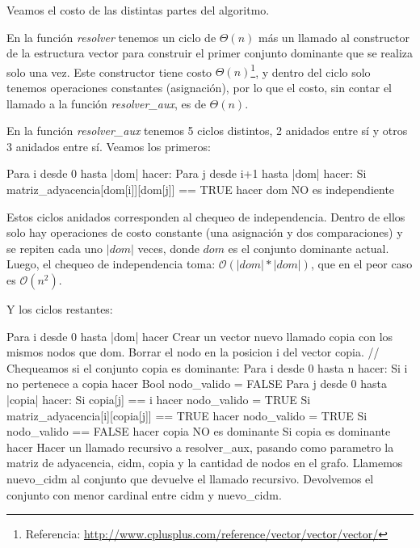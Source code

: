 Veamos el costo de las distintas partes del algoritmo.

En la función \textit{resolver} tenemos un ciclo de $\Theta(n)$ más un llamado al constructor de la estructura vector para construir el primer conjunto dominante que se realiza solo una vez. Este constructor tiene costo $\Theta(n)$\footnote{Referencia: \url{http://www.cplusplus.com/reference/vector/vector/vector/}}, y dentro del ciclo solo tenemos operaciones constantes (asignación), por lo que el costo, sin contar el llamado a la función \textit{resolver_aux}, es de $\Theta(n)$.

En la función \textit{resolver_aux} tenemos 5 ciclos distintos, 2 anidados entre sí y otros 3 anidados entre sí. Veamos los primeros:

\begin{codesnippet}
Para i desde 0 hasta |dom| hacer:
    Para j desde i+1 hasta |dom| hacer:
        Si matriz_adyacencia[dom[i]][dom[j]] == TRUE hacer
            dom NO es independiente
\end{codesnippet}

Estos ciclos anidados corresponden al chequeo de independencia. Dentro de ellos solo hay operaciones de costo constante (una asignación y dos comparaciones) y se repiten cada uno $|dom|$ veces, donde $dom$ es el conjunto dominante actual. Luego, el chequeo de independencia toma: $\mathcal{O}(|dom|*|dom|)$, que en el peor caso es $\mathcal{O}(n^2)$.

Y los ciclos restantes:

\begin{codesnippet}
Para i desde 0 hasta |dom| hacer
    Crear un vector nuevo llamado copia con los mismos nodos que dom.
    Borrar el nodo en la posicion i del vector copia.
    // Chequeamos si el conjunto copia es dominante:
    Para i desde 0 hasta n hacer:
        Si i no pertenece a copia hacer
            Bool nodo_valido = FALSE
            Para j desde 0 hasta |copia| hacer:
                Si copia[j] == i hacer
                    nodo_valido = TRUE
                Si matriz_adyacencia[i][copia[j]] == TRUE hacer
                    nodo_valido = TRUE
            Si nodo_valido == FALSE hacer
                copia NO es dominante
    Si copia es dominante hacer
        Hacer un llamado recursivo a resolver_aux, pasando como parametro la matriz
            de adyacencia, cidm, copia y la cantidad de nodos en el grafo.
        Llamemos nuevo_cidm al conjunto que devuelve el llamado recursivo.
        Devolvemos el conjunto con menor cardinal entre cidm y nuevo_cidm.
\end{codesnippet}

